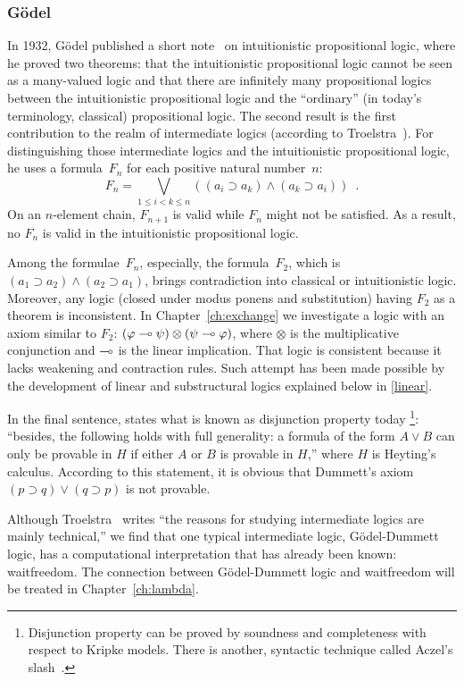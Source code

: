 \subsubsection{G\"odel}
In 1932, G\"odel published a short note~\cite{godelprop} on
intuitionistic propositional
logic, where he proved two theorems: that the intuitionistic propositional logic
cannot be seen as a many-valued logic and that
there are infinitely many propositional logics between the
intuitionistic propositional logic and the ``ordinary'' (in today's
terminology, classical) propositional logic.  The second result is the
first contribution to the realm of intermediate
logics (according to Troelstra~\cite[p.~223]{goedelcollected}).
For distinguishing those intermediate logics and the intuitionistic
propositional logic, he uses a formula~$F_n$ for each positive natural
number~$n$:
\[
 F_n = \bigvee_{1\le i < k\le n}\left((a_i\supset a_k) \land (a_k\supset a_i)\right)\enspace.
\]
On an $n$-element chain, $F_{n+1}$ is valid while $F_n$ might not be
satisfied.  As a result, no $F_n$ is valid in the intuitionistic
propositional logic.

Among the formulae~$F_n$,
especially, the formula~$F_2$, which is $(a_1\supset a_2)\land (a_2\supset
a_1)$, brings contradiction into classical or intuitionistic logic.
Moreover, any logic (closed under modus ponens and substitution) having
$F_2$ as a theorem is inconsistent.
In Chapter~\ref{ch:exchange} we investigate a logic with an axiom similar to $F_2$:
$(\varphi\multimap\psi)\otimes(\psi\multimap\varphi)$, where $\otimes$ is the
multiplicative conjunction and $\multimap$ is the linear implication.
That logic is consistent because it lacks weakening and contraction rules.
Such
attempt has been made possible by the development of linear and
substructural logics explained below in \ref{linear}.

In the final sentence, \citet{godelprop} states what is known as
disjunction property today%
\footnote{Disjunction property can be proved by soundness and
completeness with respect to Kripke models.  There is another, syntactic
technique called Aczel's slash~\citep[Ch.~3. 5.7.]{troelstra1988constructivism}.}: ``besides, the
following holds with full
generality: a formula of the form $A\lor B$ can only be provable in $H$
if either $A$ or $B$ is provable in $H$,'' where $H$ is Heyting's calculus.
According to this statement, it is obvious that Dummett's axiom
$(p\supset q) \lor (q\supset p)$ is not provable.

Although Troelstra~\cite[p.~223]{goedelcollected} writes ``the reasons
for studying intermediate logics are mainly technical,'' we find that
one typical intermediate logic, G\"odel-Dummett logic, has a
computational interpretation that has already been known: waitfreedom.
The connection between G\"odel-Dummett logic and waitfreedom will be
treated in Chapter~\ref{ch:lambda}.

